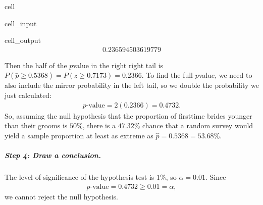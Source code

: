 \documentclass[letterpaper,10pt,english]{jupyterBook}
\begin{document}
\begin{sphinxuseclass}{cell}\begin{sphinxVerbatimInput}

\begin{sphinxuseclass}{cell_input}
\begin{sphinxVerbatim}[commandchars=\\\{\}]
\end{sphinxVerbatim}

\end{sphinxuseclass}\end{sphinxVerbatimInput}
\begin{sphinxVerbatimOutput}

\begin{sphinxuseclass}{cell_output}\begin{equation*}
\begin{split}0.236594503619779\end{split}
\end{equation*}
\end{sphinxuseclass}\end{sphinxVerbatimOutput}

\end{sphinxuseclass}
\sphinxAtStartPar
Then the half of the \(p\)\sphinxhyphen{}value in the right right tail is \(P(\hat{p} \geq 0.5368) = P(z \geq 0.7173) = 0.2366.\) To find the full \(p\)\sphinxhyphen{}value, we need to also include the mirror probability in the left tail, so we double the probability we just calculated:
\begin{equation*}
\begin{split} p\text{-value} = 2(0.2366) = 0.4732. \end{split}
\end{equation*}
\sphinxAtStartPar
So, assuming the null hypothesis that the proportion of first\sphinxhyphen{}time brides younger than their grooms is \(50\%\), there is a \(47.32\%\) chance that a random survey would yield a sample proportion at least as extreme as \(\hat{p} = 0.5368 = 53.68\%\).


\subparagraph{Step 4: Draw a conclusion.}
\label{\detokenize{Ch6 An Introduction to Hypothesis Testing/6.4 Hypothesis Tests of One Population:id13}}
\sphinxAtStartPar
The level of significance of the hypothesis test is \(1\%\), so \(\alpha = 0.01\). Since
\begin{equation*}
\begin{split} p\text{-value} = 0.4732 \geq 0.01 = \alpha, \end{split}
\end{equation*}
\sphinxAtStartPar
we cannot reject the null hypothesis.
\end{document}
